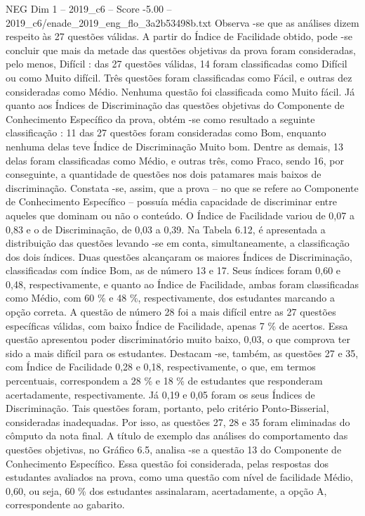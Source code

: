 \begin{textsample}{NEG Dim 1 – 2019\_c6 – Score -5.00 – 2019\_c6/enade\_2019\_eng\_flo\_3a2b53498b.txt}
Observa -se que as análises dizem respeito às 27 questões válidas.
A partir do Índice de Facilidade obtido, pode -se concluir que mais da metade das questões objetivas da prova foram consideradas, pelo menos, Difícil : das 27 questões válidas, 14 foram classificadas como Difícil ou como Muito difícil.
Três questões foram classificadas como Fácil, e outras dez consideradas como Médio.
Nenhuma questão foi classificada como Muito fácil.
Já quanto aos Índices de Discriminação das questões objetivas do Componente de Conhecimento Específico da prova, obtém -se como resultado a seguinte classificação : 11 das 27 questões foram consideradas como Bom, enquanto nenhuma delas teve Índice de Discriminação Muito bom.
Dentre as demais, 13 delas foram classificadas como Médio, e outras três, como Fraco, sendo 16, por conseguinte, a quantidade de questões nos dois patamares mais baixos de discriminação.
Constata -se, assim, que a prova – no que se refere ao Componente de Conhecimento Específico – possuía média capacidade de discriminar entre aqueles que dominam ou não o conteúdo.
O Índice de Facilidade variou de 0,07 a 0,83 e o de Discriminação, de 0,03 a 0,39.
Na Tabela 6.12, é apresentada a distribuição das questões levando -se em conta, simultaneamente, a classificação dos dois índices.
Duas questões alcançaram os maiores Índices de Discriminação, classificadas com índice Bom, as de número 13 e 17.
Seus índices foram 0,60 e 0,48, respectivamente, e quanto ao Índice de Facilidade, ambas foram classificadas como Médio, com 60 \% e 48 \%, respectivamente, dos estudantes marcando a opção correta.
A questão de número 28 foi a mais difícil entre as 27 questões específicas válidas, com baixo Índice de Facilidade, apenas 7 \% de acertos.
Essa questão apresentou poder discriminatório muito baixo, 0,03, o que comprova ter sido a mais difícil para os estudantes.
Destacam -se, também, as questões 27 e 35, com Índice de Facilidade 0,28 e 0,18, respectivamente, o que, em termos percentuais, correspondem a 28 \% e 18 \% de estudantes que responderam acertadamente, respectivamente.
Já 0,19 e 0,05 foram os seus Índices de Discriminação.
Tais questões foram, portanto, pelo critério Ponto-Bisserial, consideradas inadequadas.
Por isso, as questões 27, 28 e 35 foram eliminadas do cômputo da nota final.
A título de exemplo das análises do comportamento das questões objetivas, no Gráfico 6.5, analisa -se a questão 13 do Componente de Conhecimento Específico.
Essa questão foi considerada, pelas respostas dos estudantes avaliados na prova, como uma questão com nível de facilidade Médio, 0,60, ou seja, 60 \% dos estudantes assinalaram, acertadamente, a opção A, correspondente ao gabarito.

\end{textsample}

